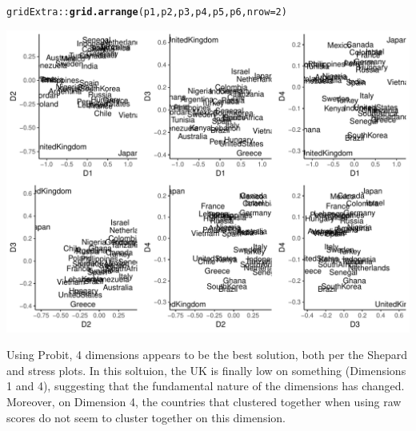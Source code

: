 \documentclass{article}\usepackage[]{graphicx}\usepackage[]{color}
\makeatletter
\def\maxwidth{ %
  \ifdim\Gin@nat@width>\linewidth
    \linewidth
  \else
    \Gin@nat@width
  \fi
}
\newcommand{\hlnum}[1]{\textcolor[rgb]{0.686,0.059,0.569}{#1}}%
\newcommand{\hlopt}[1]{\textcolor[rgb]{0,0,0}{#1}}%
\newcommand{\hlstd}[1]{\textcolor[rgb]{0.345,0.345,0.345}{#1}}%
\newcommand{\hlkwc}[1]{\textcolor[rgb]{0.333,0.667,0.333}{#1}}%
\newcommand{\hlkwd}[1]{\textcolor[rgb]{0.737,0.353,0.396}{\textbf{#1}}}%
\newenvironment{kframe}{%
 \def\at@end@of@kframe{}%
 \ifinner\ifhmode%
  \def\at@end@of@kframe{\end{minipage}}%
  \begin{minipage}{\columnwidth}%
 \fi\fi%
 \def\FrameCommand##1{\hskip\@totalleftmargin \hskip-\fboxsep
 \colorbox{shadecolor}{##1}\hskip-\fboxsep
     \hskip-\linewidth \hskip-\@totalleftmargin \hskip\columnwidth}%
 \MakeFramed {\advance\hsize-\width
   \@totalleftmargin\z@ \linewidth\hsize
   \@setminipage}}%
 {\par\unskip\endMakeFramed%
 \at@end@of@kframe}
\newenvironment{knitrout}{}{} %
\makeatother
\begin{document}
\begin{knitrout}
\begin{kframe}
\begin{alltt}
\hlstd{gridExtra}\hlopt{::}\hlkwd{grid.arrange}\hlstd{(p1, p2, p3, p4, p5, p6,} \hlkwc{nrow} \hlstd{=} \hlnum{2}\hlstd{)}
\end{alltt}
\end{kframe}
\includegraphics[width=\maxwidth]{figure/unnamed-chunk-16-1} 

\end{knitrout}
Using Probit, 4 dimensions appears to be the best solution, both per the Shepard and stress plots. In this soltuion, the UK is finally low on something (Dimensions 1 and 4), suggesting that the fundamental nature of the dimensions has changed. Moreover, on Dimension 4, the countries that clustered together when using raw scores do not seem to cluster together on this dimension.  
\end{document}
